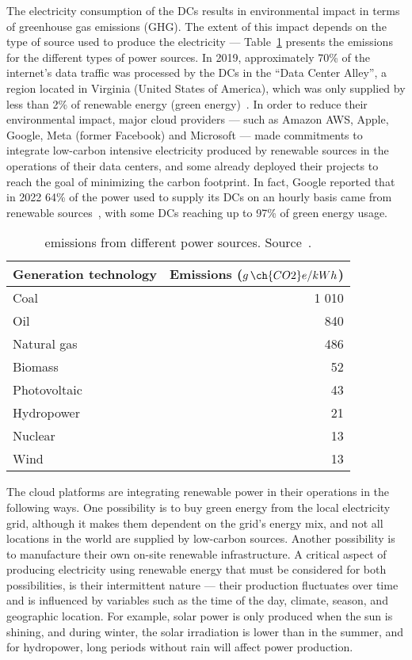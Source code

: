 The electricity consumption of the DCs results in environmental impact in terms of greenhouse gas emissions (GHG). The extent of this impact depends on the type of source used to produce the electricity --- Table~\ref{tab:co2_power_sources} presents the emissions for the different types of power sources. In 2019, approximately 70\% of the internet's data traffic was processed by the DCs in the ``Data Center Alley'', a region located in Virginia (United States of America), which was only supplied by less than 2\% of renewable energy (green energy)~\cite{clicking_clean_virginia}. In order to reduce their environmental impact, major cloud providers --- such as Amazon AWS, Apple, Google, Meta (former Facebook) and Microsoft --- made commitments to integrate low-carbon intensive electricity produced by renewable sources in the operations of their data centers, and some already deployed their projects to reach the goal of minimizing the carbon footprint. In fact, Google reported that in 2022 64\% of the power used to supply its DCs on an hourly basis came from renewable sources~\cite{google_sustainability_report_2023}, with some DCs reaching up to 97\% of green energy usage.

\begin{table}[!ht]

\caption{  emissions from different power sources. Source~\cite{nrel_lifecycle_2021}.}\label{tab:co2_power_sources} \centering

\begin{tabular}{|l|r|}
  \hline
  \textbf{Generation technology} & \textbf{Emissions ($g\,\ch{CO2}e/kWh$)}   \\
  \hline  
  Coal   & 1 010\\  
  \hline
  Oil   & 840\\
  \hline
  Natural gas   & 486\\
   \hline
  Biomass   & 52 \\
  \hline
  Photovoltaic   & 43 \\
  \hline
  Hydropower & 21 \\
  \hline
  Nuclear   & 13 \\
  \hline
  Wind   & 13 \\
  \hline
\end{tabular}
\end{table}


The cloud platforms are integrating renewable power in their operations in the following ways. One possibility is to buy green energy from the local electricity grid, although it makes them dependent on the grid's energy mix, and not all locations in the world are supplied by low-carbon sources. Another possibility is to manufacture their own on-site renewable infrastructure. A critical aspect of producing electricity using renewable energy that must be considered for both possibilities,  is their intermittent nature --- their production fluctuates over time and is influenced by variables such as the time of the day, climate, season, and geographic location. For example, solar power is only produced when the sun is shining, and during winter, the solar irradiation is lower than in the summer, and for hydropower, long periods without rain will affect power production.


